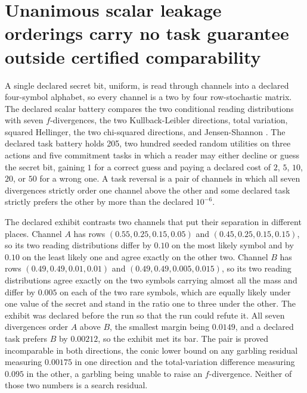 \documentclass[aps,pre,reprint,nofootinbib]{revtex4-2}
\begin{document}
\section{Unanimous scalar leakage orderings carry no task guarantee
outside certified comparability}
\label{sec:cr2}

A single declared secret bit, uniform, is read through channels into a
declared four-symbol alphabet, so every channel is a two by four
row-stochastic matrix.  The declared scalar battery compares the two
conditional reading distributions with seven $f$-divergences, the two
Kullback-Leibler directions, total variation, squared Hellinger, the
two chi-squared directions, and Jensen-Shannon \cite{CoverThomas2006}.
The declared task battery holds 205, two hundred seeded random
utilities on three actions and five commitment tasks in which a reader
may either decline or guess the secret bit, gaining $1$ for a correct
guess and paying a declared cost of $2$, $5$, $10$, $20$, or $50$ for
a wrong one.  A task reversal is a pair of channels in which all seven
divergences strictly order one channel above the other and some
declared task strictly prefers the other by more than the declared
$10^{-6}$.

The declared exhibit contrasts two channels that put their separation
in different places.  Channel $A$
has rows $(0.55, 0.25, 0.15, 0.05)$ and $(0.45, 0.25, 0.15, 0.15)$, so
its two reading distributions differ by $0.10$ on the most likely
symbol and by $0.10$ on the least likely one and agree exactly on the
other two.  Channel $B$ has rows $(0.49, 0.49, 0.01, 0.01)$ and
$(0.49, 0.49, 0.005, 0.015)$, so its two reading distributions agree
exactly on the two symbols carrying almost all the mass and differ by
$0.005$ on each of the two rare symbols, which are equally likely
under one value of the secret and stand in the ratio one to three
under the other.  The exhibit was declared before the run so that the
run could refute it.  All seven divergences order $A$ above $B$, the
smallest margin being $0.0149$, and a declared task prefers $B$ by
$0.00212$, so the exhibit met its bar.  The pair is proved
incomparable in both directions, the conic lower bound on any garbling
residual measuring $0.00175$ in one direction and the total-variation
difference measuring $0.095$ in the other, a garbling being unable to
raise an $f$-divergence.  Neither of those two numbers is a search
residual.
\end{document}
